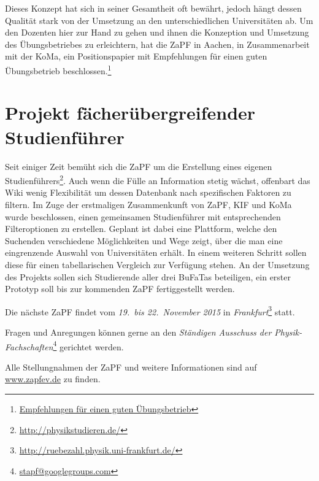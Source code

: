 \documentclass{scrartcl}
\begin{document}
Dieses Konzept hat sich in seiner Gesamtheit oft bewährt, jedoch hängt dessen Qualität stark von der Umsetzung an den unterschiedlichen Universitäten ab. Um den Dozenten hier zur Hand zu gehen und ihnen die Konzeption und
Umsetzung des Übungsbetriebes zu erleichtern, hat die ZaPF in Aachen, in
Zusammenarbeit mit der KoMa, ein Positionspapier mit Empfehlungen
für einen guten Übungsbetrieb beschlossen.\footnote{\href{https://vmp.ethz.ch/zapfwiki/images/0/03/Positionspapier\_SoSe15\_Uebungskonzepte.pdf}{Empfehlungen für einen guten Übungsbetrieb}}

\section*{Projekt fächerübergreifender Studienführer }

Seit einiger Zeit bemüht sich die ZaPF um die Erstellung eines eigenen
Studienführers\footnote{\href{http://physikstudieren.de/}{\url{http://physikstudieren.de/}}}.
Auch wenn die Fülle an Information stetig wächst, offenbart das Wiki wenig
Flexibilität um dessen Datenbank nach spezifischen Faktoren zu filtern. Im
Zuge der erstmaligen Zusammenkunft von ZaPF, KIF und KoMa wurde beschlossen, einen gemeinsamen Studienführer mit entsprechenden
Filteroptionen zu erstellen. Geplant ist dabei eine Plattform, welche den
Suchenden verschiedene Möglichkeiten und Wege zeigt, über die man eine
eingrenzende Auswahl von Universitäten erhält. In einem weiteren Schritt sollen
diese für einen tabellarischen Vergleich zur Verfügung stehen.  An der
Umsetzung des Projekts sollen sich Studierende aller drei BuFaTas beteiligen, ein
erster Prototyp soll bis zur kommenden ZaPF fertiggestellt werden.


\vspace{0.5cm}
Die nächste ZaPF findet vom \emph{19.\ bis 22.\ November 2015} in \emph{Frankfurt}\footnote{\href{http://ruebezahl.physik.uni-frankfurt.de/}{\url{http://ruebezahl.physik.uni-frankfurt.de/}}} statt.

Fragen und Anregungen können gerne an den \emph{Ständigen Ausschuss der Physik-Fachschaften}\footnote{\href{mailto:stapf@googlegroups.com}{\url{stapf@googlegroups.com}}} gerichtet werden.

Alle Stellungnahmen der ZaPF und weitere Informationen sind auf \href{http://www.zapfev.de}{\url{www.zapfev.de}} zu finden.
\end{document}
